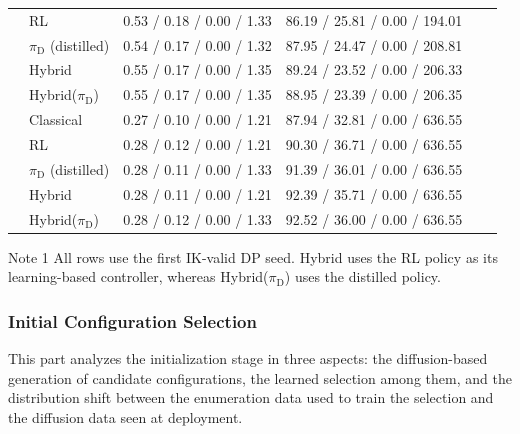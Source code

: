 \documentclass[journal, twoside]{IEEEtran}
\newcommand{\rev}[1]{\begingroup\color{magenta}#1\endgroup}
\begin{document}
\begin{table}[!htbp]
{\begin{threeparttable}
\begin{tabular}{llcccc}
& RL                        & \rev{0.53 / 0.18 / 0.00 / 1.33} & \rev{86.19 / 25.81 / 0.00 / 194.01} \\
& $\pi_{\mathrm{D}}$ (distilled)      & \rev{0.54 / 0.17 / 0.00 / 1.32} & \rev{87.95 / 24.47 / 0.00 / 208.81} \\
& Hybrid                    & \rev{0.55 / 0.17 / 0.00 / 1.35} & \rev{89.24 / 23.52 / 0.00 / 206.33} \\
& Hybrid($\pi_{\mathrm{D}}$)          & \rev{0.55 / 0.17 / 0.00 / 1.35} & \rev{88.95 / 23.39 / 0.00 / 206.35} \\
\midrule
\multirow{5}{*}{\shortstack{Difficult\\{\scriptsize \rev{($n{=}1627$)}}}}
& \rev{Classical}                  & \rev{0.27 / 0.10 / 0.00 / 1.21} & \rev{87.94 / 32.81 / 0.00 / 636.55} \\
& RL                        & \rev{0.28 / 0.12 / 0.00 / 1.21} & \rev{90.30 / 36.71 / 0.00 / 636.55} \\
& $\pi_{\mathrm{D}}$ (distilled)      & \rev{0.28 / 0.11 / 0.00 / 1.33} & \rev{91.39 / 36.01 / 0.00 / 636.55} \\
& Hybrid                    & \rev{0.28 / 0.11 / 0.00 / 1.21} & \rev{92.39 / 35.71 / 0.00 / 636.55} \\
& Hybrid($\pi_{\mathrm{D}}$)          & \rev{0.28 / 0.12 / 0.00 / 1.33} & \rev{92.52 / 36.00 / 0.00 / 636.55} \\
\bottomrule
\end{tabular}
\begin{tablenotes}
    \item[Note 1] \rev{All rows use the first IK-valid DP seed. Hybrid uses the RL policy as its learning-based controller, whereas Hybrid($\pi_{\mathrm{D}}$) uses the distilled policy.}
\end{tablenotes}
\end{threeparttable}}
\end{table}

\subsubsection{Initial Configuration Selection}
\rev{This part analyzes the initialization stage in three aspects: the diffusion-based generation of candidate configurations, the learned selection among them, and the distribution shift between the enumeration data used to train the selection and the diffusion data seen at deployment.}
\end{document}
